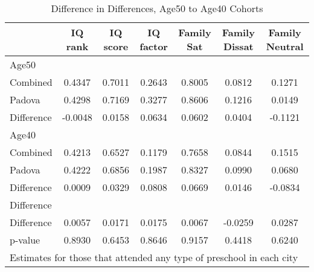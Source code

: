 \begin{table}[htbp]\centering
\caption{Difference in Differences, Age50 to Age40 Cohorts}
\begin{tabular}{l*{6}{c}}
\hline\hline
            &     IQ rank&    IQ score&   IQ factor&  Family Sat&Family Dissat&Family Neutral\\
\hline
Age50       &            &            &            &            &            &            \\
Combined    &      0.4347&      0.7011&      0.2643&      0.8005&      0.0812&      0.1271\\
Padova      &      0.4298&      0.7169&      0.3277&      0.8606&      0.1216&      0.0149\\
Difference  &     -0.0048&      0.0158&      0.0634&      0.0602&      0.0404&     -0.1121\\
\hline
Age40       &            &            &            &            &            &            \\
Combined    &      0.4213&      0.6527&      0.1179&      0.7658&      0.0844&      0.1515\\
Padova      &      0.4222&      0.6856&      0.1987&      0.8327&      0.0990&      0.0680\\
Difference  &      0.0009&      0.0329&      0.0808&      0.0669&      0.0146&     -0.0834\\
\hline
Difference  &            &            &            &            &            &            \\
Difference  &      0.0057&      0.0171&      0.0175&      0.0067&     -0.0259&      0.0287\\
p-value     &      0.8930&      0.6453&      0.8646&      0.9157&      0.4418&      0.6240\\
\hline\hline
\multicolumn{7}{l}{\footnotesize Estimates for those that attended any type of preschool in each city}\\
\end{tabular}
\end{table}
